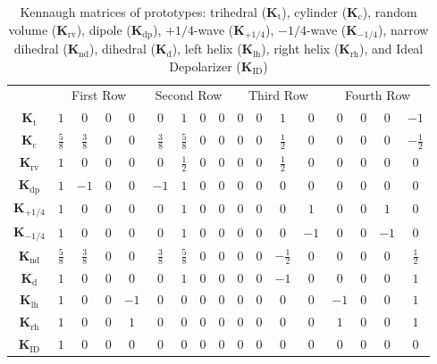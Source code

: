 \documentclass[journal]{IEEEtran}
\begin{document}
	\begin{table}[hbt]
		\centering
		\caption{Kennaugh matrices of prototypes: {trihedral} ($\bm{K}_{\text{t}}$),
			{cylinder} ($\bm{K}_{\text{c}}$),
			{random volume} ($\bm{K}_{\text{rv}}$),
			{dipole} ($\bm{K}_{\text{dp}}$),
			{$+1/4$-wave} ($\bm{K}_{+1/4}$), 
			{$-1/4$-wave} ($\bm{K}_{-1/4}$),
			{narrow dihedral} ($\bm{K}_{\text{nd}}$),
			{dihedral} ($\bm{K}_{\text{d}}$),
			{left helix} ($\bm{K}_{\text{lh}}$), 
			{right helix} ($\bm{K}_{\text{rh}}$), 
			and Ideal Depolarizer ($\bm{K}_{\text{ID}}$)}\label{Tab:ElementaryK}
		\setlength{\tabcolsep}{2.7pt}
		\renewcommand{\arraystretch}{1.3}
		\begin{tabular}{*{17}{c}}\toprule
			&	\multicolumn{4}{c}{First Row} 
			& \multicolumn{4}{c}{Second Row} 
			& \multicolumn{4}{c}{Third Row} 
			& \multicolumn{4}{c}{Fourth Row}\\ 
			\cmidrule(rl){2-5} \cmidrule(rl){6-9} \cmidrule(rl){10-13} \cmidrule(rl){14-17} 
			$\bm K_{\text{t}}$
			& $1$ & $0$ & $0$ & $0$
			& $0$ & $1$ & $0$ & $0$
			& $0$ & $0$ & $1$ & $0$
			& $0$ & $0$ & $0$ & $-1$ \\
			$\bm K_{\text{c}}$
			& $\frac{5}{8}$ & $\frac{3}{8}$ & $0$ & $0$
			& $\frac{3}{8}$ & $\frac{5}{8}$ & $0$ & $0$
			& $0$ & $0$ & $\frac{1}{2}$ & $0$
			& $0$ & $0$ & $0$ & $-\frac{1}{2}$\\
			$\bm K_{\text{rv}}$ 
			& $1$ & $0$ & $0$ & $0$
			& $0$ & $\frac{1}{2}$ & $0$ & $0$
			& $0$ & $0$ & $\frac{1}{2}$ & $0$
			& $0$ & $0$ & $0$ & $0$\\
			$\bm K_\text{dp}$
			& $1$ & $-1$ & $0$ & $0$
			& $-1$ & $1$ & $0$ & $0$
			& $0$ & $0$ & $0$ & $0$
			& $0$ & $0$ & $0$ & $0$\\
			$\bm K_{+1/4}$
			& $1$ & $0$ & $0$ & $0$
			& $0$ & $1$ & $0$ & $0$
			& $0$ & $0$ & $0$ & $1$
			& $0$ & $0$ & $1$ & $0$\\
			$\bm K_{-1/4}$
			& $1$ & $0$ & $0$ & $0$
			& $0$ & $1$ & $0$ & $0$
			& $0$ & $0$ & $0$ & $-1$
			& $0$ & $0$ & $-1$ & $0$\\
			$\bm K_{\text{nd}}$ 
			&$\frac{5}{8}$ & $\frac{3}{8}$ & $0$ & $0$
			& $\frac{3}{8}$ & $\frac{5}{8}$ & $0$ & $0$
			& $0$ & $0$ & $-\frac{1}{2}$ & $0$
			& $0$ & $0$ & $0$ & $\frac{1}{2}$\\
			$\bm K_{\text{d}}$ &
			$1$ & $0$ & $0$ & $0$
			& $0$ & $1$ & $0$ & $0$
			& $0$ & $0$ & $-1$ & $0$
			& $0$ & $0$ & $0$ & $1$ \\
			$ \bm K_{\text{lh}}$
			& $1$ & $0$ & $0$ & $-1$
			& $0$ & $0$ & $0$ & $0$
			& $0$ & $0$ & $0$ & $0$
			& $-1$ & $0$ & $0$ & $1$\\
			$ \bm K_{\text{rh}}$
			& $1$ & $0$ & $0$ & $1$
			& $0$ & $0$ & $0$ & $0$
			& $0$ & $0$ & $0$ & $0$
			& $1$ & $0$ & $0$ & $1$\\
			$\bm{K}_{\text{ID}}$
			& $1$ & $0$ & $0$ & $0$
			& $0$ & $0$ & $0$ & $0$
			& $0$ & $0$ & $0$ & $0$
			& $0$ & $0$ & $0$ & $0$ \\
			\bottomrule
		\end{tabular}
	\end{table}
	
\end{document}
